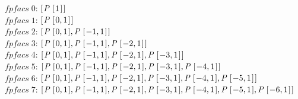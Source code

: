 \documentclass[tikz]{scrreprt}
\newcommand{\Conid}[1]{\mathit{#1}}
\newcommand{\Varid}[1]{\mathit{#1}}
\begin{document}
\begin{minipage}{\textwidth}
\ensuremath{\Varid{fpfacs}\;\mathrm{0}}: \ensuremath{[\mskip1.5mu \Conid{P}\;[\mskip1.5mu \mathrm{1}\mskip1.5mu]\mskip1.5mu]}\\
\ensuremath{\Varid{fpfacs}\;\mathrm{1}}: \ensuremath{[\mskip1.5mu \Conid{P}\;[\mskip1.5mu \mathrm{0},\mathrm{1}\mskip1.5mu]\mskip1.5mu]}\\
\ensuremath{\Varid{fpfacs}\;\mathrm{2}}: \ensuremath{[\mskip1.5mu \Conid{P}\;[\mskip1.5mu \mathrm{0},\mathrm{1}\mskip1.5mu],\Conid{P}\;[\mskip1.5mu \mathbin{-}\mathrm{1},\mathrm{1}\mskip1.5mu]\mskip1.5mu]}\\
\ensuremath{\Varid{fpfacs}\;\mathrm{3}}: \ensuremath{[\mskip1.5mu \Conid{P}\;[\mskip1.5mu \mathrm{0},\mathrm{1}\mskip1.5mu],\Conid{P}\;[\mskip1.5mu \mathbin{-}\mathrm{1},\mathrm{1}\mskip1.5mu],\Conid{P}\;[\mskip1.5mu \mathbin{-}\mathrm{2},\mathrm{1}\mskip1.5mu]\mskip1.5mu]}\\
\ensuremath{\Varid{fpfacs}\;\mathrm{4}}: \ensuremath{[\mskip1.5mu \Conid{P}\;[\mskip1.5mu \mathrm{0},\mathrm{1}\mskip1.5mu],\Conid{P}\;[\mskip1.5mu \mathbin{-}\mathrm{1},\mathrm{1}\mskip1.5mu],\Conid{P}\;[\mskip1.5mu \mathbin{-}\mathrm{2},\mathrm{1}\mskip1.5mu],\Conid{P}\;[\mskip1.5mu \mathbin{-}\mathrm{3},\mathrm{1}\mskip1.5mu]\mskip1.5mu]}\\
\ensuremath{\Varid{fpfacs}\;\mathrm{5}}: \ensuremath{[\mskip1.5mu \Conid{P}\;[\mskip1.5mu \mathrm{0},\mathrm{1}\mskip1.5mu],\Conid{P}\;[\mskip1.5mu \mathbin{-}\mathrm{1},\mathrm{1}\mskip1.5mu],\Conid{P}\;[\mskip1.5mu \mathbin{-}\mathrm{2},\mathrm{1}\mskip1.5mu],\Conid{P}\;[\mskip1.5mu \mathbin{-}\mathrm{3},\mathrm{1}\mskip1.5mu],\Conid{P}\;[\mskip1.5mu \mathbin{-}\mathrm{4},\mathrm{1}\mskip1.5mu]\mskip1.5mu]}\\
\ensuremath{\Varid{fpfacs}\;\mathrm{6}}: \ensuremath{[\mskip1.5mu \Conid{P}\;[\mskip1.5mu \mathrm{0},\mathrm{1}\mskip1.5mu],\Conid{P}\;[\mskip1.5mu \mathbin{-}\mathrm{1},\mathrm{1}\mskip1.5mu],\Conid{P}\;[\mskip1.5mu \mathbin{-}\mathrm{2},\mathrm{1}\mskip1.5mu],\Conid{P}\;[\mskip1.5mu \mathbin{-}\mathrm{3},\mathrm{1}\mskip1.5mu],\Conid{P}\;[\mskip1.5mu \mathbin{-}\mathrm{4},\mathrm{1}\mskip1.5mu],\Conid{P}\;[\mskip1.5mu \mathbin{-}\mathrm{5},\mathrm{1}\mskip1.5mu]\mskip1.5mu]}\\
\ensuremath{\Varid{fpfacs}\;\mathrm{7}}: \ensuremath{[\mskip1.5mu \Conid{P}\;[\mskip1.5mu \mathrm{0},\mathrm{1}\mskip1.5mu],\Conid{P}\;[\mskip1.5mu \mathbin{-}\mathrm{1},\mathrm{1}\mskip1.5mu],\Conid{P}\;[\mskip1.5mu \mathbin{-}\mathrm{2},\mathrm{1}\mskip1.5mu],\Conid{P}\;[\mskip1.5mu \mathbin{-}\mathrm{3},\mathrm{1}\mskip1.5mu],\Conid{P}\;[\mskip1.5mu \mathbin{-}\mathrm{4},\mathrm{1}\mskip1.5mu],\Conid{P}\;[\mskip1.5mu \mathbin{-}\mathrm{5},\mathrm{1}\mskip1.5mu],\Conid{P}\;[\mskip1.5mu \mathbin{-}\mathrm{6},\mathrm{1}\mskip1.5mu]\mskip1.5mu]}
\end{minipage}
\end{document}
